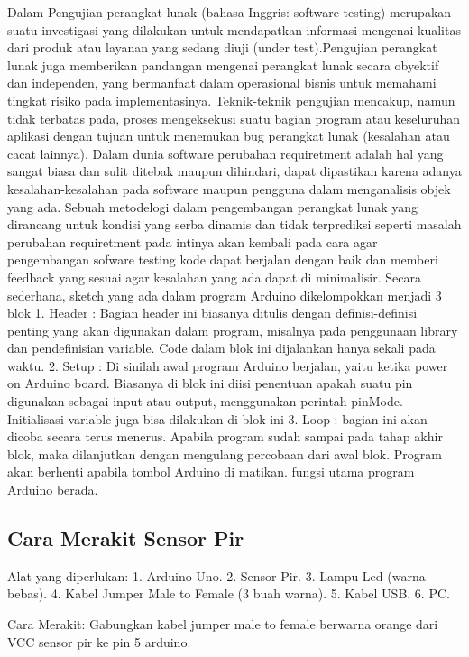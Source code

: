 \documentclass{article}
\begin{document}
Dalam \cite{evans2013arduino} Pengujian perangkat lunak (bahasa Inggris: software testing) merupakan suatu investigasi yang dilakukan untuk mendapatkan informasi mengenai kualitas dari produk atau layanan yang sedang diuji (under test).Pengujian perangkat lunak juga memberikan pandangan mengenai perangkat lunak secara obyektif dan independen, yang bermanfaat dalam operasional bisnis untuk memahami tingkat risiko pada implementasinya. Teknik-teknik pengujian mencakup, namun tidak terbatas pada, proses mengeksekusi suatu bagian program atau keseluruhan aplikasi dengan tujuan untuk menemukan bug perangkat lunak (kesalahan atau cacat lainnya).
Dalam dunia software perubahan requiretment adalah hal yang sangat biasa dan sulit ditebak maupun dihindari, dapat dipastikan karena adanya kesalahan-kesalahan pada software maupun pengguna dalam menganalisis objek yang ada. Sebuah metodelogi dalam pengembangan perangkat lunak yang dirancang untuk kondisi yang serba dinamis dan tidak terprediksi seperti masalah perubahan requiretment pada intinya akan kembali pada cara agar pengembangan sofware testing kode dapat berjalan dengan baik dan memberi feedback yang sesuai agar kesalahan yang ada dapat di minimalisir.
Secara sederhana, sketch yang ada dalam program Arduino dikelompokkan menjadi 3 blok 
1.	Header	: Bagian header ini biasanya ditulis dengan definisi-definisi penting yang akan digunakan dalam program, misalnya pada penggunaan library dan pendefinisian variable. Code dalam blok ini dijalankan hanya sekali pada waktu.
2.	Setup	: Di sinilah awal program Arduino berjalan, yaitu ketika power on Arduino board. Biasanya di blok ini diisi penentuan apakah suatu pin digunakan sebagai input atau output, menggunakan perintah pinMode. Initialisasi variable juga bisa dilakukan di blok ini
3.	Loop	: bagian ini akan dicoba secara terus menerus. Apabila program sudah sampai pada tahap akhir blok, maka dilanjutkan dengan mengulang percobaan dari awal blok. Program akan berhenti apabila tombol Arduino di matikan. fungsi utama program Arduino berada.

\subsection {Cara Merakit Sensor Pir}

Alat yang diperlukan:
1. Arduino Uno.
2. Sensor Pir.
3. Lampu Led (warna bebas).
4. Kabel Jumper Male to Female (3 buah warna).
5. Kabel USB.
6. PC.

Cara Merakit:
Gabungkan kabel jumper male to female berwarna orange dari VCC sensor pir ke pin 5 arduino.
\end{document}
